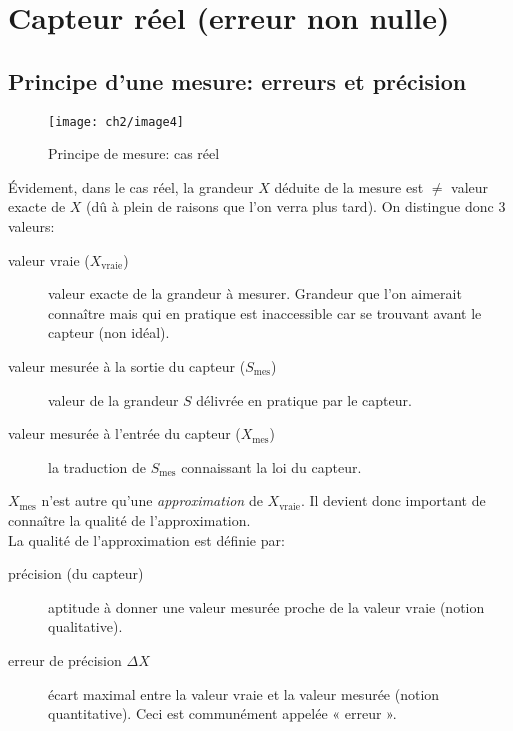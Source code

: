 \section{Capteur réel (erreur non nulle)}
\subsection{Principe d'une mesure: erreurs et précision}
\begin{figure}[H] 
	\centering 
	\texttt{[image: ch2/image4]}
	\caption{Principe de mesure: cas réel} 
\end{figure}
Évidement, dans le cas réel, la grandeur $X$ déduite de la mesure est $\neq$ valeur exacte de $X$ (dû à plein de raisons que l'on verra plus tard). On distingue donc 3 valeurs:
\begin{description}
	\item[valeur vraie ($X_{\text{vraie}}$)] valeur exacte de la grandeur à mesurer. Grandeur que l'on aimerait connaître mais qui en pratique est inaccessible car se trouvant avant le capteur (non idéal).
	\item[valeur mesurée à la sortie du capteur ($S_{\text{mes}}$)] valeur de la grandeur $S$ délivrée en pratique par le capteur.
	\item[valeur mesurée à l'entrée du capteur ($X_{\text{mes}}$)] la traduction de $S_{\text{mes}}$ connaissant la loi du capteur.
\end{description} 
$X_{\text{mes}}$ n'est autre qu'une \emph{approximation} de $X_{\text{vraie}}$. Il devient donc important de connaître la qualité de l'approximation.\\

La qualité de l'approximation est définie par:
\begin{description}
	\item[précision (du capteur)] aptitude à donner une valeur mesurée proche de la valeur vraie (notion qualitative).
	\item[erreur de précision $\Delta X$] écart maximal entre la valeur vraie et la valeur mesurée (notion quantitative). Ceci est communément appelée « erreur ».
\end{description}

